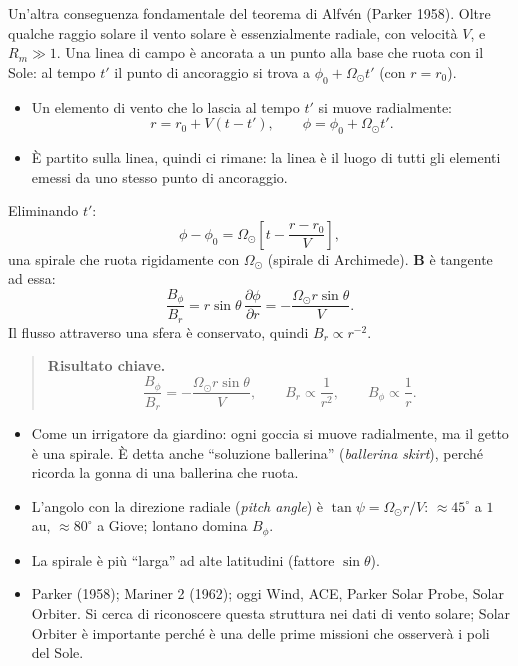 Un'altra conseguenza fondamentale del teorema di Alfvén (Parker 1958). Oltre qualche raggio solare il vento solare è essenzialmente radiale, con velocità $V$, e $R_m\gg1$. Una linea di campo è ancorata a un punto alla base che ruota con il Sole: al tempo $t'$ il punto di ancoraggio si trova a $\phi_0+\Omega_\odot t'$ (con $r=r_0$).
\begin{itemize}
\item Un elemento di vento che lo lascia al tempo $t'$ si muove radialmente:
\begin{equation}
r=r_0+V(t-t'),\qquad\phi=\phi_0+\Omega_\odot t'.
\end{equation}
\item È partito sulla linea, quindi ci rimane: la linea è il luogo di tutti gli elementi emessi da uno stesso punto di ancoraggio.
\end{itemize}
Eliminando $t'$:
\begin{equation}
\phi-\phi_0=\Omega_\odot\left[t-\frac{r-r_0}{V}\right],
\end{equation}
una spirale che ruota rigidamente con $\Omega_\odot$ (spirale di Archimede). $\mathbf{B}$ è tangente ad essa:
\begin{equation}
\frac{B_\phi}{B_r}=r\sin\theta\,\frac{\partial\phi}{\partial r}=-\frac{\Omega_\odot r\sin\theta}{V}.
\end{equation}
Il flusso attraverso una sfera è conservato, quindi $B_r\propto r^{-2}$.

\begin{quote}
\textbf{Risultato chiave.}
\[
\frac{B_\phi}{B_r}=-\frac{\Omega_\odot r\sin\theta}{V},\qquad B_r\propto\frac{1}{r^2},\qquad B_\phi\propto\frac1r .
\]
\end{quote}

\begin{itemize}
\item Come un irrigatore da giardino: ogni goccia si muove radialmente, ma il getto è una spirale. È detta anche ``soluzione ballerina'' (\emph{ballerina skirt}), perché ricorda la gonna di una ballerina che ruota.
\item L'angolo con la direzione radiale (\emph{pitch angle}) è $\tan\psi=\Omega_\odot r/V$: $\approx45^\circ$ a $1\,$au, $\approx80^\circ$ a Giove; lontano domina $B_\phi$.
\item La spirale è più ``larga'' ad alte latitudini (fattore $\sin\theta$).
\item Parker (1958); Mariner 2 (1962); oggi Wind, ACE, Parker Solar Probe, Solar Orbiter. Si cerca di riconoscere questa struttura nei dati di vento solare; Solar Orbiter è importante perché è una delle prime missioni che osserverà i poli del Sole.
\end{itemize}

